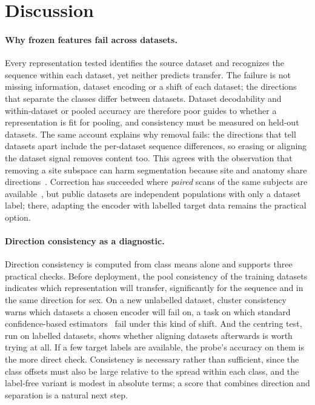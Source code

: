 \documentclass[11pt]{article}
\begin{document}
\section{Discussion}

\paragraph{Why frozen features fail across datasets.}
Every representation tested identifies the source dataset and recognizes the
sequence within each dataset, yet neither predicts transfer. The failure is
not missing information, dataset encoding or a shift of each dataset; the
directions that separate the classes differ between datasets. Dataset
decodability and within-dataset or pooled accuracy are therefore poor guides
to whether a representation is fit for pooling, and consistency must be
measured on held-out datasets. The same account explains why removal fails:
the directions that tell datasets apart include the per-dataset sequence
differences, so erasing or aligning the dataset signal removes content too.
This agrees with the observation that removing a site subspace can harm
segmentation because site and anatomy share
directions~\cite{rahbar_frozen_2026}. Correction has succeeded where \emph{paired}
scans of the same subjects are available~\cite{donle_featmap_2026}, but public
datasets are independent populations with only a dataset label; there,
adapting the encoder with labelled target data remains the practical option.

\paragraph{Direction consistency as a diagnostic.}
Direction consistency is computed from class means alone and supports three
practical checks. Before deployment, the
pool consistency of the training datasets indicates which representation
will transfer, significantly for the sequence and in the same direction for
sex. On a new unlabelled dataset, cluster consistency warns which datasets a
chosen encoder will fail on, a task on which standard confidence-based
estimators~\cite{hendrycks_baseline_2017, garg_leveraging_2022} fail under
this kind of shift. And the centring test, run on labelled datasets, shows
whether aligning datasets afterwards is worth trying at all. If a few target labels are available, the
probe's accuracy on them is the more direct check. Consistency is necessary
rather than sufficient, since the class offsets must also be large relative
to the spread within each class, and the label-free variant is modest in
absolute terms; a score that combines direction and separation is a natural
next step.
\end{document}
